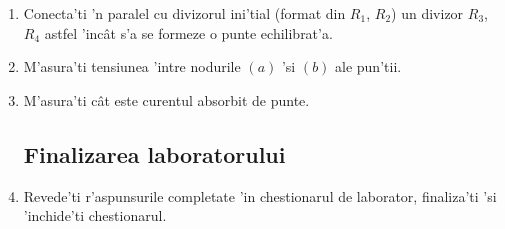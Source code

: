 \begin{enumerate}
\item Conecta'ti 'n paralel cu divizorul ini'tial (format din $R_1$, $R_2$) un divizor $R_3$, $R_4$ astfel 'inc\^at s'a se formeze o punte echilibrat'a. 
\item M'asura'ti tensiunea 'intre nodurile $(a)$ 'si $(b)$ ale pun'tii.
\item M'asura'ti c\^at este curentul absorbit de punte.

\subsection{Finalizarea laboratorului}

\item Revede'ti r'aspunsurile completate 'in chestionarul de laborator, finaliza'ti 'si 'inchide'ti chestionarul.
\end{enumerate}





